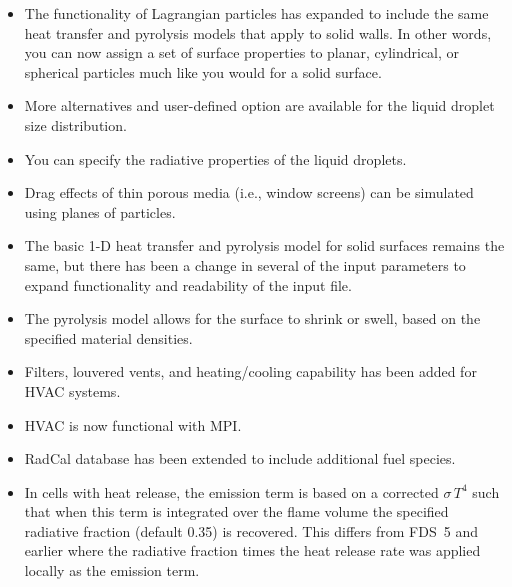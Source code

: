 \documentclass[11pt]{book}
\begin{document}

    \begin{itemize}
    \item The functionality of Lagrangian particles has expanded to include the same heat transfer and pyrolysis models that apply to solid walls. In other words, you can now assign a set of surface properties to planar, cylindrical, or spherical particles much like you would for a solid surface.
    \item More alternatives and user-defined option are available for the liquid droplet size distribution.
    \item You can specify the radiative properties of the liquid droplets.
    \item Drag effects of thin porous media (i.e., window screens) can be simulated using planes of particles.
    \end{itemize}


    \begin{itemize}
    \item The basic 1-D heat transfer and pyrolysis model for solid surfaces remains the same, but there has been a change in several of the input parameters to expand functionality and readability of the input file.
    \item The pyrolysis model allows for the surface to shrink or swell, based on the specified material densities.
    \end{itemize}


   \begin{itemize}
    \item Filters, louvered vents, and heating/cooling capability has been added for HVAC systems.
    \item HVAC is now functional with MPI.
    \end{itemize}


    \begin{itemize}
    \item RadCal database has been extended to include additional fuel species.
    \item In cells with heat release, the emission term is based on a corrected $\sigma \, T^4$ such that when this term is integrated over the flame volume the specified radiative fraction (default 0.35) is recovered. This differs from FDS~5 and earlier where the radiative fraction times the heat release rate was applied locally as the emission term.
    \end{itemize}
\end{document}
